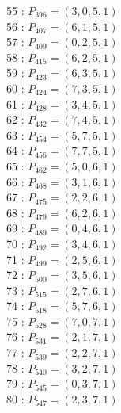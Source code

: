 \documentclass{article}
\begin{document}
{\begin{multicols}{3}
55 : $P_{396}=( 3, 0, 5, 1 )$\\
56 : $P_{407}=( 6, 1, 5, 1 )$\\
57 : $P_{409}=( 0, 2, 5, 1 )$\\
58 : $P_{415}=( 6, 2, 5, 1 )$\\
59 : $P_{423}=( 6, 3, 5, 1 )$\\
60 : $P_{424}=( 7, 3, 5, 1 )$\\
61 : $P_{428}=( 3, 4, 5, 1 )$\\
62 : $P_{432}=( 7, 4, 5, 1 )$\\
63 : $P_{454}=( 5, 7, 5, 1 )$\\
64 : $P_{456}=( 7, 7, 5, 1 )$\\
65 : $P_{462}=( 5, 0, 6, 1 )$\\
66 : $P_{468}=( 3, 1, 6, 1 )$\\
67 : $P_{475}=( 2, 2, 6, 1 )$\\
68 : $P_{479}=( 6, 2, 6, 1 )$\\
69 : $P_{489}=( 0, 4, 6, 1 )$\\
70 : $P_{492}=( 3, 4, 6, 1 )$\\
71 : $P_{499}=( 2, 5, 6, 1 )$\\
72 : $P_{500}=( 3, 5, 6, 1 )$\\
73 : $P_{515}=( 2, 7, 6, 1 )$\\
74 : $P_{518}=( 5, 7, 6, 1 )$\\
75 : $P_{528}=( 7, 0, 7, 1 )$\\
76 : $P_{531}=( 2, 1, 7, 1 )$\\
77 : $P_{539}=( 2, 2, 7, 1 )$\\
78 : $P_{540}=( 3, 2, 7, 1 )$\\
79 : $P_{545}=( 0, 3, 7, 1 )$\\
80 : $P_{547}=( 2, 3, 7, 1 )$\\
\end{multicols}


%


%


}%
\end{document}

